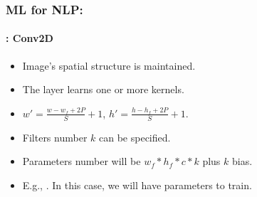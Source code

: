 \documentclass[xcolor=table]{beamer}
\begin{document}
	\begin{frame}
		\frametitle{ML for NLP: \insertsection}
		\framesubtitle{\insertsubsection: Conv2D}
		
		\begin{minipage}{0.60\textwidth} 
			\begin{itemize}
				\item Image's spatial structure is maintained.
				\item The layer learns one or more kernels.
				\item $ w' = \frac{w - w_f + 2P}{S} + 1$,  $ h' = \frac{h - h_f + 2P}{S} + 1$.
				\item Filters number $k$ can be specified.
				\item Parameters number will be $w_f * h_f * c * k$ plus $k$ bias.
				\item E.g., . In this case, we will have  parameters to train.
			\end{itemize}
		\end{minipage}
		\begin{minipage}{0.39\textwidth}
		\end{minipage}
		
	\end{frame}
\end{document}
